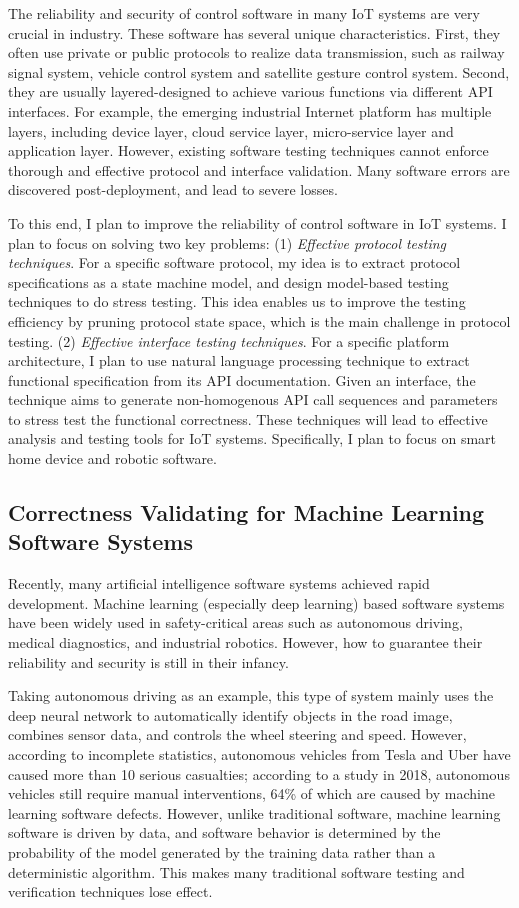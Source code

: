 \documentclass[a4paper]{article}
\begin{document}
The reliability and security of control software in many IoT systems are very crucial in industry.
These software has several unique characteristics. 
First, they often use private or public protocols to realize data transmission, such as railway signal system, vehicle control system and satellite gesture control system. 
Second, they are usually layered-designed to achieve various functions via different API interfaces.
For example, the emerging industrial Internet platform has multiple layers, including device layer, cloud service layer, micro-service layer and application layer. 
However, existing software testing techniques cannot enforce thorough and effective protocol and interface validation. Many software errors are discovered post-deployment, and lead to severe losses. 

To this end, I plan to improve the reliability of control software in
IoT systems. I plan to focus on solving two key problems: 
(1) \emph{Effective protocol testing techniques}. 
For a specific software protocol, my idea is to extract protocol specifications as a state machine model, and design model-based testing techniques to do stress testing. 
This idea enables us to improve the testing efficiency by pruning protocol state space,
which is the main challenge in protocol testing.
(2) \emph{Effective interface testing techniques}.
For a specific platform architecture, I plan to use natural language processing technique to extract functional specification from its API documentation. 
Given an interface, the technique aims to generate non-homogenous API call sequences and parameters to stress test the functional correctness.
These techniques will lead to effective analysis and testing tools for IoT systems. Specifically, I plan to focus on smart home device and robotic software.

\subsection{Correctness Validating for Machine Learning Software Systems}

Recently, many artificial intelligence software systems achieved rapid development. Machine learning (especially deep learning) based software systems have been widely used in safety-critical areas such as autonomous driving, medical diagnostics, and industrial robotics. However, how to guarantee their reliability and security is still in their infancy. 

Taking autonomous driving as an example, this type of system mainly uses the deep neural network to automatically identify objects in the road image, combines sensor data, and controls the wheel steering and speed. However, according to incomplete statistics,
autonomous vehicles from Tesla and Uber have caused more than 10 serious casualties; 
according to a study in 2018, autonomous vehicles still require manual interventions, 64\% of which are caused by machine learning software defects.
However, unlike traditional software, machine learning software is driven by data, and software behavior is determined by the probability of the model generated by the training data rather than
a deterministic algorithm. This makes many traditional software testing and verification techniques lose effect.
\end{document}
